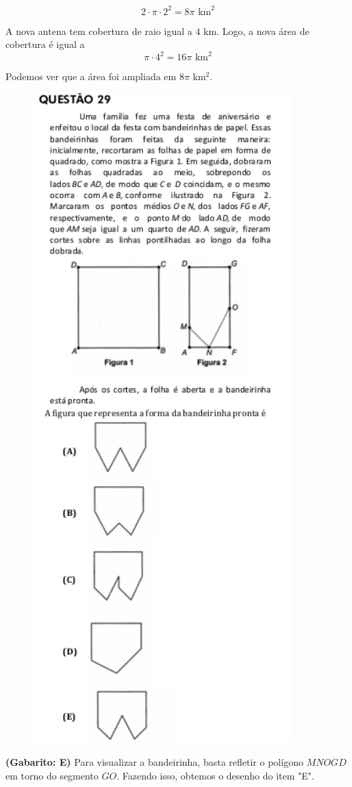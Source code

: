 \documentclass[a4paper]{article}
\begin{document}
\begin{equation*}
2\cdot \pi\cdot 2^2 = 8\pi \text{ km}^2
\end{equation*}
\par\vspace{0.3cm} A nova antena tem cobertura de raio igual a $4$ km. Logo, a nova área de cobertura é igual a 
\begin{equation*}
\pi\cdot 4^2 = 16\pi \text{ km}^2
\end{equation*}
\par\vspace{0.3cm} Podemos ver que a área foi ampliada em $8\pi$ km$^2$.
\begin{figure}[H]
	\begin{center}
		\includegraphics[width=10cm]{L5Q29.png}
	\end{center}
\end{figure}
\par\textbf{(Gabarito: E)} Para visualizar a bandeirinha, basta refletir o polígono $MNOGD$ em torno do segmento $GO$. Fazendo isso, obtemos o desenho do item "E".
\end{document}
